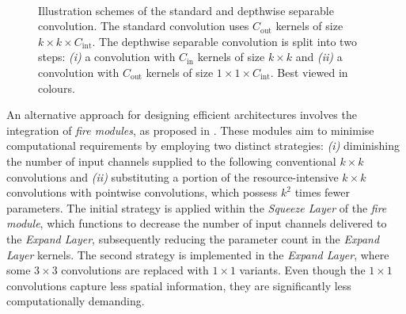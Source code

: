 \begin{figure}[htbp]
\centering
{}\\
    \vspace{1cm}
    \caption{Illustration schemes of the standard and depthwise separable
    convolution. The standard convolution uses $C_\text{out}$ kernels of size
    $k\times k \times C_\text{int}$. The depthwise separable convolution is
    split into two steps: \emph{(i)} a convolution with $C_\text{in}$ kernels
    of size $k \times k$ and \emph{(ii)} a convolution with $C_\text{out}$
    kernels of size $1\times 1 \times C_\text{int}$.
    Best viewed in colours.}
\label{fig:sota:depthwise_conv_vs_standard_conv}
\end{figure}


An alternative approach for designing efficient architectures involves the
integration of \emph{fire modules}, as proposed in
\cite{DBLP:journals/corr/IandolaMAHDK16}. These modules aim to minimise
computational requirements by employing two distinct strategies: \emph{(i)}
diminishing the number of input channels supplied to the following conventional
$k\times k$ convolutions and \emph{(ii)} substituting a portion of the
resource-intensive $k\times k$ convolutions with pointwise convolutions, which
possess $k^2$ times fewer parameters. The initial strategy is applied within the
\emph{Squeeze Layer} of the \emph{fire module}, which functions to decrease the
number of input channels delivered to the \emph{Expand Layer}, subsequently
reducing the parameter count in the \emph{Expand Layer} kernels. The second
strategy is implemented in the \emph{Expand Layer}, where some $3\times3$
convolutions are replaced with $1\times1$ variants. Even though the $1\times1$
convolutions capture less spatial information, they are significantly less
computationally demanding.\\

